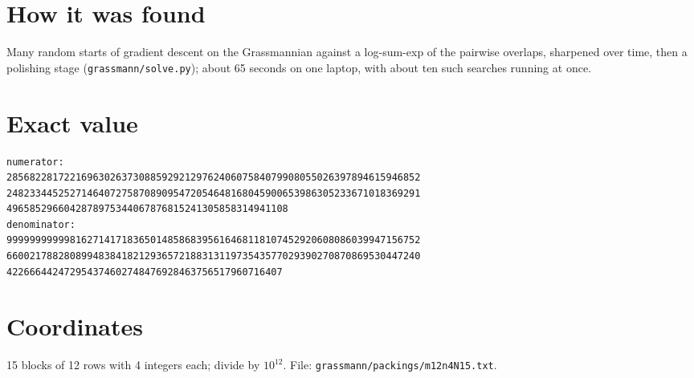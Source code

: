 \documentclass[11pt,a4paper]{article}
\begin{document}
\section{How it was found}
Many random starts of gradient descent on the Grassmannian against a log-sum-exp of the pairwise overlaps, sharpened over time, then a polishing stage (\texttt{grassmann/solve.py}); about 65 seconds on one laptop, with about ten such searches running at once.


\appendix
\section{Exact value}
{\small
\begin{verbatim}
numerator:
285682281722169630263730885929212976240607584079908055026397894615946852
248233445252714640727587089095472054648168045900653986305233671018369291
4965852966042878975344067876815241305858314941108
denominator:
999999999998162714171836501485868395616468118107452920608086039947156752
660021788280899483841821293657218831311973543577029390270870869530447240
422666442472954374602748476928463756517960716407
\end{verbatim}}

\section{Coordinates}
15 blocks of 12 rows with 4 integers each; divide by $10^{12}$. File: \texttt{grassmann/packings/m12n4N15.txt}.
{\tiny
\begin{multicols}{3}
\end{multicols}}
\end{document}
